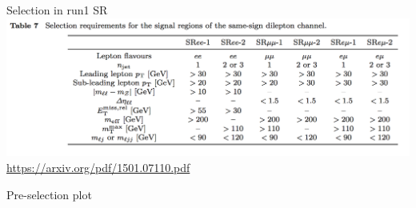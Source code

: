 \documentclass[mathserif,serif]{beamer}
\begin{document}
\begin{frame}{Selection in run1 SR}
\includegraphics[width=\textwidth]{data/photo/SRcutrun1.png} \\
\url{https://arxiv.org/pdf/1501.07110.pdf}
\end{frame}

\begin{frame}
\begin{center}
\huge
Pre-selection plot
\end{center}
\end{frame}
\end{document}
